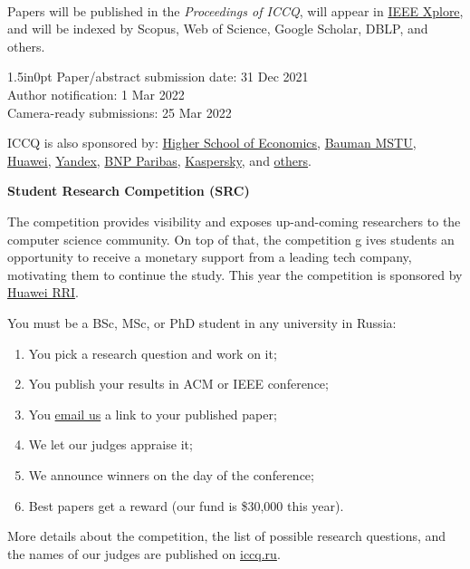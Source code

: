 \documentclass{../cfp}
\begin{document}
Papers will be published in the \textit{Proceedings of ICCQ},
will appear in \href{https://ieeexplore.ieee.org/Xplore/home.jsp}{IEEE Xplore\textsuperscript{\textregistered}},
and will be indexed by Scopus, Web of Science, Google Scholar, DBLP, and others.

\begin{adjustwidth}{1.5in}{0pt}
\vspace{6pt}
Paper/abstract submission date: 31 Dec 2021 \\
Author notification: 1 Mar 2022 \\
Camera-ready submissions: 25 Mar 2022

\vspace{6pt}
ICCQ is also sponsored by:
\href{https://www.hse.ru/en/}{Higher School of Economics},
\href{https://bmstu.ru/en/}{Bauman MSTU},
\href{https://www.huawei.com/}{Huawei},
\href{https://yandex.com/company/}{Yandex},
\href{https://www.linkedin.com/company/btechrussia}{BNP Paribas},
\href{https://www.kaspersky.com/}{Kaspersky},
and \href{https://www.iccq.ru/2022.html#partners}{others}.
\end{adjustwidth}

\newpage

{\color{red}\bfseries{\Large Student Research Competition (SRC)}}

The competition provides visibility and exposes up-and-coming
researchers to the computer science community. On top of that, the competition g
ives students an opportunity to receive a monetary support from a leading tech
company, motivating them to continue the study.
This year the competition is sponsored by \href{https://career.huawei.ru/rri/}{Huawei RRI}.

You must be a BSc, MSc, or PhD student in any university in Russia:

\begin{enumerate}
\item You pick a research question and work on it;
\item You publish your results in ACM or IEEE conference;
\item You \href{mailto:src@iccq.ru}{email us} a link to your published paper;
\item We let our judges appraise it;
\item We announce winners on the day of the conference;
\item Best papers get a reward (our fund is \$30,000 this year).
\end{enumerate}

More details about the competition, the list of possible research questions,
and the names of our judges are published on \href{https://www.iccq.ru}{iccq.ru}.

\end{document}
